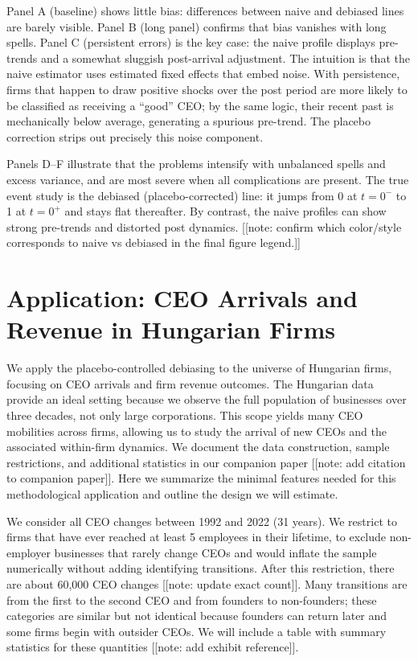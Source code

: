 \documentclass[11pt,a4paper]{article}
\begin{document}
Panel A (baseline) shows little bias: differences between naive and debiased lines are barely visible. Panel B (long panel) confirms that bias vanishes with long spells. Panel C (persistent errors) is the key case: the naive profile displays pre-trends and a somewhat sluggish post-arrival adjustment. The intuition is that the naive estimator uses estimated fixed effects that embed noise. With persistence, firms that happen to draw positive shocks over the post period are more likely to be classified as receiving a “good” CEO; by the same logic, their recent past is mechanically below average, generating a spurious pre-trend. The placebo correction strips out precisely this noise component.

Panels D–F illustrate that the problems intensify with unbalanced spells and excess variance, and are most severe when all complications are present. The true event study is the debiased (placebo-corrected) line: it jumps from 0 at $t=0^{-}$ to 1 at $t=0^{+}$ and stays flat thereafter. By contrast, the naive profiles can show strong pre-trends and distorted post dynamics. [[note: confirm which color/style corresponds to naive vs debiased in the final figure legend.]]

\section{Application: CEO Arrivals and Revenue in Hungarian Firms}

We apply the placebo-controlled debiasing to the universe of Hungarian firms, focusing on CEO arrivals and firm revenue outcomes. The Hungarian data provide an ideal setting because we observe the full population of businesses over three decades, not only large corporations. This scope yields many CEO mobilities across firms, allowing us to study the arrival of new CEOs and the associated within-firm dynamics. We document the data construction, sample restrictions, and additional statistics in our companion paper [[note: add citation to companion paper]]. Here we summarize the minimal features needed for this methodological application and outline the design we will estimate.

We consider all CEO changes between 1992 and 2022 (31 years). We restrict to firms that have ever reached at least 5 employees in their lifetime, to exclude non-employer businesses that rarely change CEOs and would inflate the sample numerically without adding identifying transitions. After this restriction, there are about 60,000 CEO changes [[note: update exact count]]. Many transitions are from the first to the second CEO and from founders to non-founders; these categories are similar but not identical because founders can return later and some firms begin with outsider CEOs. We will include a table with summary statistics for these quantities [[note: add exhibit reference]].
\end{document}
